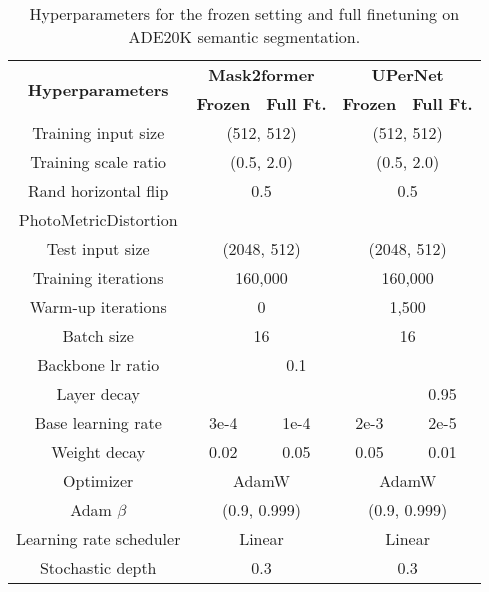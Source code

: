 \documentclass{article}
\newcommand{\cmark}{\text{\ding{51}}}
\newcommand{\xmark}{\text{\ding{55}}}
\begin{document}
\begin{table}[h]\small
    \centering \begin{tabular}{c|cc|cc}
    \toprule
    \multirow{2}{*}{\textbf{Hyperparameters}} & \multicolumn{2}{c|}{\textbf{Mask2former}} & \multicolumn{2}{c}{\textbf{UPerNet}} \\
    & \textbf{Frozen} & \textbf{Full Ft.} & \textbf{Frozen} & \textbf{Full Ft.} \\
    \hline
    Training input size & \multicolumn{2}{c|}{(512, 512)} & \multicolumn{2}{c}{(512, 512)} \\
    Training scale ratio & \multicolumn{2}{c|}{(0.5, 2.0)} & \multicolumn{2}{c}{(0.5, 2.0)} \\
    Rand horizontal flip & \multicolumn{2}{c|}{0.5} & \multicolumn{2}{c}{0.5} \\
    PhotoMetricDistortion & \multicolumn{2}{c|}{\cmark} & \multicolumn{2}{c}{\cmark} \\
    Test input size & \multicolumn{2}{c|}{(2048, 512)} &  \multicolumn{2}{c}{(2048, 512)} \\
    \hline
    Training iterations & \multicolumn{2}{c|}{160,000} & \multicolumn{2}{c}{160,000} \\
    Warm-up iterations & \multicolumn{2}{c|}{0} & \multicolumn{2}{c}{1,500} \\
    Batch size & \multicolumn{2}{c|}{16} & \multicolumn{2}{c}{16} \\
    Backbone lr ratio & \xmark & 0.1 & \xmark & \xmark  \\
    Layer decay & \xmark & \xmark & \xmark & 0.95 \\
    Base learning rate & 3e-4 & 1e-4 & 2e-3 & 2e-5 \\
    Weight decay & 0.02 & 0.05 & 0.05 & 0.01 \\
    Optimizer & \multicolumn{2}{c|}{AdamW} & \multicolumn{2}{c}{AdamW} \\
    Adam $\beta$ & \multicolumn{2}{c|}{(0.9, 0.999)} & \multicolumn{2}{c}{(0.9, 0.999)} \\
    Learning rate scheduler & \multicolumn{2}{c|}{Linear} & \multicolumn{2}{c}{Linear} \\
    Stochastic depth & \multicolumn{2}{c|}{0.3} & \multicolumn{2}{c}{0.3} \\
    \bottomrule
    \end{tabular}
    \vspace{0.5em}
    \caption{Hyperparameters for the frozen setting and full finetuning on ADE20K semantic segmentation.}
    \label{table:setting-ade}
\end{table}
\end{document}
